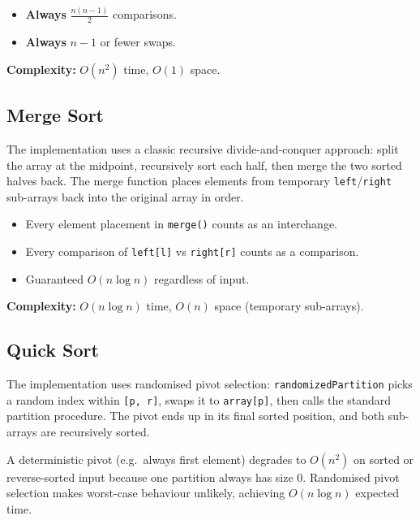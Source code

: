 \documentclass[12pt,a4paper]{article}
\begin{document}
\begin{itemize}[nosep]
    \item \textbf{Always} $\frac{n(n-1)}{2}$ comparisons.
    \item \textbf{Always} $n-1$ or fewer swaps.
\end{itemize}

\textbf{Complexity:} $O(n^2)$ time, $O(1)$ space.

\subsection{Merge Sort}

The implementation uses a classic recursive divide-and-conquer approach:
split the array at the midpoint, recursively sort each half, then merge the
two sorted halves back. The merge function places elements from temporary
\texttt{left}/\texttt{right} sub-arrays back into the original array in order.

\begin{itemize}[nosep]
    \item Every element placement in \texttt{merge()} counts as an interchange.
    \item Every comparison of \texttt{left[l]} vs \texttt{right[r]} counts
          as a comparison.
    \item Guaranteed $O(n \log n)$ regardless of input.
\end{itemize}

\textbf{Complexity:} $O(n \log n)$ time, $O(n)$ space (temporary sub-arrays).

\subsection{Quick Sort}

The implementation uses randomised pivot selection: \texttt{randomizedPartition}
picks a random index within \texttt{[p, r]}, swaps it to \texttt{array[p]},
then calls the standard partition procedure. The pivot ends up in its final
sorted position, and both sub-arrays are recursively sorted.

\begin{infobox}[title=Why Randomised Pivot?]
    A deterministic pivot (e.g.\ always first element) degrades to $O(n^2)$
    on sorted or reverse-sorted input because one partition always has size 0.
    Randomised pivot selection makes worst-case behaviour unlikely, achieving
    $O(n \log n)$ expected time.
\end{infobox}
\end{document}
